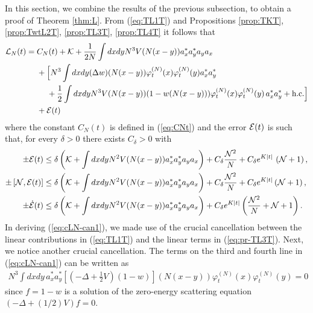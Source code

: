 \documentclass[11pt,a4paper]{article}
\newcommand{\ech}[2]{#2}	%
\newcommand{\ekt}{e^{K\lvert t\rvert}}	%
\newcommand{\cE}{{\cal E}}
\newcommand{\cK}{{\cal K}}
\newcommand{\cL}{{\cal L}}
\newcommand{\cN}{{\cal N}}
\newcommand{\Ncal}{\mathcal{N}}		%
\begin{document}
In this section, we combine the results of the previous subsection, to obtain a proof of Theorem \ref{thm:L}. {F}rom (\ref{eq:TL1T}) and Propositions \ref{prop:TKT}, \ref{prop:TwtL2T}, \ref{prop:TL3T}, \ref{prop:TL4T} it follows that
\begin{equation}\label{eq:cLN-can1} \begin{split} 
\cL_N (t) = \; &C_N (t) + \cK  + \frac{1}{2N}  \int dx dy N^3 V (N (x-y)) a_x^* a_y^* a_y a_x \\
&+ \Big[ N^3 \int dx dy (\Delta w) (N (x-y)) \varphi_t^{(N)} (x) \varphi_t^{(N)} (y)  a_x^* a_y^* \\ 
&\quad\;+ \frac{1}{2} \int dx dy N^3 V(N (x-y)) (1- w(N(x-y))) \varphi_t^{(N)} (x) \varphi_t^{(N)} (y)\, a_x^* a_y^*%
+ \text{h.c.} \Big]  
\\ &+ \cE (t) 
\end{split} \end{equation}
where the constant $C_N (t)$ is defined in (\ref{eq:CNt}) and the error $\cE (t)$ is such that, for every $\delta > 0$ there exists $C_\delta > 0$ with
\begin{equation}\label{eq:cE-tot}
\begin{split} \pm \cE (t) &\leq \delta \left( \cK + \int dx dy N^2 V(N
(x-y)) a_x^* a_y^* a_y a_x \right) + C_\delta \frac{\cN^2}{N} + C_\delta
\ech{\| \varphi_t^{(N)} \|_{H^2}^2}{\ekt} \, \left( \cN + 1 \right), \\
\pm \left[ \cN ,  \cE (t)\right]  &\leq \delta \left( \cK + \int dx dy N^2
V(N (x-y)) a_x^* a_y^* a_y a_x \right) + C_\delta \frac{\cN^2}{N}  +
C_\delta \ech{\| \varphi^{(N)}_t \|_{H^2}^2}{\ekt} \left( \cN + 1 \right),\\
\pm \dot{\cE} (t) & \leq \delta \left( \cK + \int dx dy N^2 V(N (x-y)) a_x^* a_y^* a_y a_x \right) + \ech{C_\delta \| \varphi_t^{(N)} \|_{H^4}^2 \frac{\cN^2}{N} \\ &\hspace{.5cm} + C_\delta \left( \| \varphi_t^{(N)} \|_{H^4}  \| \varphi_t^{(N)} \|_{H^2} + \| \varphi_t^{(N)} \|_{H^2}^3 \right) \left(\cN+1 \right)}{C_\delta \ekt \left( \frac{\Ncal^2}{N}+\Ncal+1\right)}. 
\end{split} \end{equation}
In deriving (\ref{eq:cLN-can1}), we made use of the crucial cancellation between the linear contributions in (\ref{eq:TL1T}) and the linear terms in (\ref{eq:pr-TL3T}).  Next, we notice another crucial cancellation. The terms on the third and fourth line in (\ref{eq:cLN-can1}) can be written as
\[ \begin{split} 
N^3 \int dx dy \, a_x^* a_y^* \left[ \left(-\Delta +\frac{1}{2} V \right)(1-w) \right](N(x-y)) \varphi_t^{(N)} (x) \varphi_t^{(N)} (y) = 0 
\end{split}\]
since $f = 1-w$ is a solution of the zero-energy scattering equation $(-\Delta + (1/2) V)f = 0$.
\end{document}
